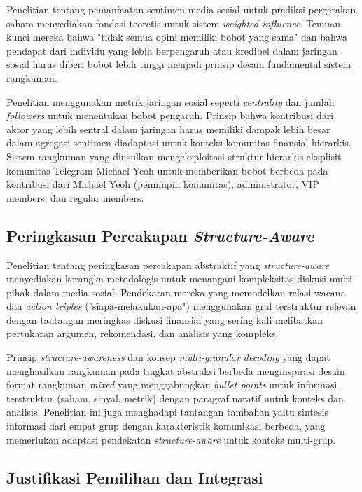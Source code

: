 Penelitian \textcite{si2014} tentang pemanfaatan sentimen media sosial untuk prediksi pergerakan saham menyediakan fondasi teoretis untuk sistem \textit{weighted influence}. Temuan kunci mereka bahwa "tidak semua opini memiliki bobot yang sama" dan bahwa pendapat dari individu yang lebih berpengaruh atau kredibel dalam jaringan sosial harus diberi bobot lebih tinggi menjadi prinsip desain fundamental sistem rangkuman.

Penelitian \textcite{si2014} menggunakan metrik jaringan sosial seperti \textit{centrality} dan jumlah \textit{followers} untuk menentukan bobot pengaruh. Prinsip bahwa kontribusi dari aktor yang lebih sentral dalam jaringan harus memiliki dampak lebih besar dalam agregasi sentimen diadaptasi untuk konteks komunitas finansial hierarkis. Sistem rangkuman yang diusulkan mengeksploitasi struktur hierarkis eksplisit komunitas Telegram Michael Yeoh untuk memberikan bobot berbeda pada kontribusi dari Michael Yeoh (pemimpin komunitas), administrator, VIP members, dan regular members.

\subsection{Peringkasan Percakapan \textit{Structure-Aware}}

Penelitian \textcite{chen2021} tentang peringkasan percakapan abstraktif yang \textit{structure-aware} menyediakan kerangka metodologis untuk menangani kompleksitas diskusi multi-pihak dalam media sosial. Pendekatan mereka yang memodelkan relasi wacana dan \textit{action triples} ("siapa-melakukan-apa") menggunakan graf terstruktur relevan dengan tantangan meringkas diskusi finansial yang sering kali melibatkan pertukaran argumen, rekomendasi, dan analisis yang kompleks.

Prinsip \textit{structure-awareness} dan konsep \textit{multi-granular decoding} yang dapat menghasilkan rangkuman pada tingkat abstraksi berbeda menginspirasi desain format rangkuman \textit{mixed} yang menggabungkan \textit{bullet points} untuk informasi terstruktur (saham, sinyal, metrik) dengan paragraf naratif untuk konteks dan analisis. Penelitian ini juga menghadapi tantangan tambahan yaitu sintesis informasi dari empat grup dengan karakteristik komunikasi berbeda, yang memerlukan adaptasi pendekatan \textit{structure-aware} untuk konteks multi-grup.

\subsection{Justifikasi Pemilihan dan Integrasi}

